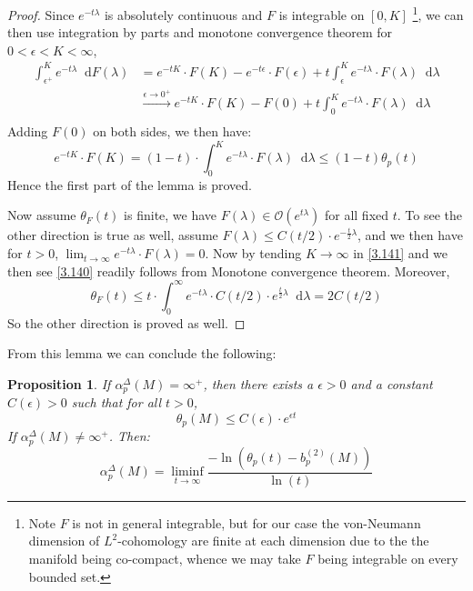 \documentclass[11pt]{report}
\theoremstyle{definition}
\theoremstyle{plain}
\newtheorem{Prop}[Def]{Proposition}
\newcommand{\mass}[1]{\mathop{}\mathrm{d}{#1}}
\begin{document}
\begin{proof}
	Since $e^{-t\lambda}$ is absolutely continuous and $F$ is integrable on $[0, K]$ \footnote{Note $F$ is not in general integrable, but for our case the von-Neumann dimension of $L^2$-cohomology are finite at each dimension due to the the manifold being co-compact, whence we may take $F$ being integrable on every bounded set.}, we can then use integration by parts and monotone convergence theorem for $0<\epsilon<K<\infty$,
\begin{equation*}
\begin{split}
\int_{\epsilon^+}^K e^{-t\lambda} \mass{F(\lambda)}&=e^{-tK}\cdot F(K)-e^{-t\epsilon}\cdot F(\epsilon)+t\int_{\epsilon}^{K}e^{-t\lambda}\cdot F(\lambda)\mass{\lambda}\\
&\overset{\epsilon\to 0^+}{\longrightarrow}e^{-tK}\cdot F(K)-F(0)+t\int_{0}^{K}e^{-t\lambda}\cdot F(\lambda)\mass{\lambda}\\
\end{split}
\end{equation*}
Adding $F(0)$ on both sides, we then have:
\begin{equation}\label{3.141}
e^{-tK}\cdot F(K)=(1-t)\cdot \int_{0}^{K}e^{-t\lambda}\cdot F(\lambda)\mass{\lambda}\leq (1-t)\theta_p(t)
\end{equation} 
Hence the first part of the lemma is proved.
\par Now assume $\theta_F(t)$ is finite, we have $F(\lambda)\in \mathcal{O}(e^{t\lambda})$ for all fixed $t$. To see the other direction is true as well, assume $F(\lambda)\leq C(t/2)\cdot e^{-\frac{t}{2}\lambda}$, and we then have for $t>0$, $\lim_{t\to \infty}e^{-t\lambda}\cdot F(\lambda)=0$. Now by tending $K\to \infty$ in \ref{3.141} and we then see \ref{3.140} readily follows from Monotone convergence theorem. Moreover,
\begin{equation}
\theta_F(t)\leq t\cdot \int_0^\infty e^{-t\lambda}\cdot C(t/2)\cdot e^{\frac{t}{2}\lambda}\mass{\lambda}=2C(t/2)
\end{equation}
So the other direction is proved as well.
\end{proof}
From this lemma we can conclude the following:
\begin{Prop}\label{3.136}
	If $\alpha_p^\Delta(M)=\infty^+$, then there exists a $\epsilon>0$ and a constant $C(\epsilon)>0$ such that for all $t>0$, 
	\begin{equation}
	\theta_p(M)\leq C(\epsilon)\cdot e^{\epsilon t}
	\end{equation} 
	If $\alpha^{\Delta}_p(M)\neq \infty^+$. Then:
	\begin{equation}\label{3.143}
	\alpha^\Delta_p(M)=\liminf_{t\to \infty}\frac{-\ln (\theta_p(t)-b_p^{(2)}(M))}{\ln(t)}
	\end{equation}
\end{Prop}
\end{document}
